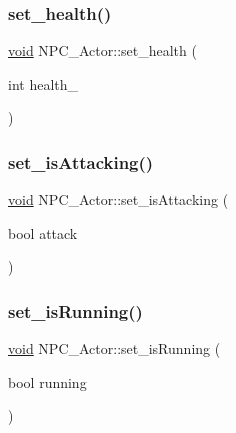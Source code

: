 \mbox{\label{classNPC__Actor_ac60f3b69ca850dbbf77c71275344f8c6}} 
\subsubsection{\texorpdfstring{set\+\_\+health()}{set\_health()}}
{\footnotesize\ttfamily \hyperlink{imgui__impl__opengl3__loader_8h_ac668e7cffd9e2e9cfee428b9b2f34fa7}{void} N\+P\+C\+\_\+\+Actor\+::set\+\_\+health (\begin{DoxyParamCaption}\item[{int}]{health\+\_\+ }\end{DoxyParamCaption})\hspace{0.3cm}{\ttfamily [inline]}}

\mbox{\label{classNPC__Actor_ab31d259c92592433e390e68915a22f69}} 
\subsubsection{\texorpdfstring{set\+\_\+is\+Attacking()}{set\_isAttacking()}}
{\footnotesize\ttfamily \hyperlink{imgui__impl__opengl3__loader_8h_ac668e7cffd9e2e9cfee428b9b2f34fa7}{void} N\+P\+C\+\_\+\+Actor\+::set\+\_\+is\+Attacking (\begin{DoxyParamCaption}\item[{bool}]{attack }\end{DoxyParamCaption})\hspace{0.3cm}{\ttfamily [inline]}}

\mbox{\label{classNPC__Actor_a78bf8b2ada74d5e95fc780feb2c1b30d}} 
\subsubsection{\texorpdfstring{set\+\_\+is\+Running()}{set\_isRunning()}}
{\footnotesize\ttfamily \hyperlink{imgui__impl__opengl3__loader_8h_ac668e7cffd9e2e9cfee428b9b2f34fa7}{void} N\+P\+C\+\_\+\+Actor\+::set\+\_\+is\+Running (\begin{DoxyParamCaption}\item[{bool}]{running }\end{DoxyParamCaption})\hspace{0.3cm}{\ttfamily [inline]}}

